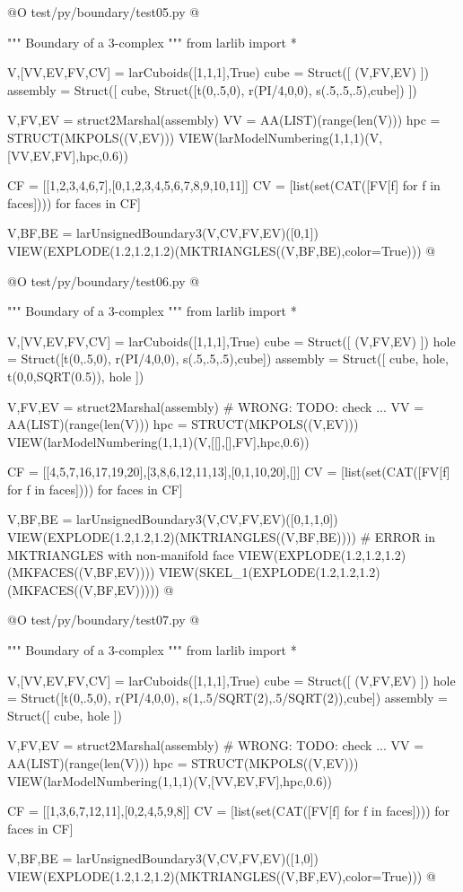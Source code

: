 \documentclass[11pt,oneside]{article}    %
\begin{document}
@O test/py/boundary/test05.py
@{""" Boundary of a 3-complex """
from larlib import *

V,[VV,EV,FV,CV] = larCuboids([1,1,1],True)
cube = Struct([ (V,FV,EV) ])
assembly = Struct([ cube, Struct([t(0,.5,0), r(PI/4,0,0), s(.5,.5,.5),cube]) ])

V,FV,EV = struct2Marshal(assembly)
VV = AA(LIST)(range(len(V)))
hpc = STRUCT(MKPOLS((V,EV)))
VIEW(larModelNumbering(1,1,1)(V,[VV,EV,FV],hpc,0.6))

CF = [[1,2,3,4,6,7],[0,1,2,3,4,5,6,7,8,9,10,11]]
CV = [list(set(CAT([FV[f]  for f in faces]))) for faces in CF]

V,BF,BE = larUnsignedBoundary3(V,CV,FV,EV)([0,1])
VIEW(EXPLODE(1.2,1.2,1.2)(MKTRIANGLES((V,BF,BE),color=True))) 
@}

@O test/py/boundary/test06.py
@{""" Boundary of a 3-complex """
from larlib import *

V,[VV,EV,FV,CV] = larCuboids([1,1,1],True)
cube = Struct([ (V,FV,EV) ])
hole = Struct([t(0,.5,0), r(PI/4,0,0), s(.5,.5,.5),cube])
assembly = Struct([ cube, hole, t(0,0,SQRT(0.5)), hole ])

V,FV,EV = struct2Marshal(assembly) # WRONG:  TODO: check ...
VV = AA(LIST)(range(len(V)))
hpc = STRUCT(MKPOLS((V,EV)))
VIEW(larModelNumbering(1,1,1)(V,[[],[],FV],hpc,0.6))

CF = [[4,5,7,16,17,19,20],[3,8,6,12,11,13],[0,1,10,20],[]]
CV = [list(set(CAT([FV[f]  for f in faces]))) for faces in CF]

V,BF,BE = larUnsignedBoundary3(V,CV,FV,EV)([0,1,1,0])
VIEW(EXPLODE(1.2,1.2,1.2)(MKTRIANGLES((V,BF,BE)))) # ERROR in MKTRIANGLES with non-manifold face
VIEW(EXPLODE(1.2,1.2,1.2)(MKFACES((V,BF,EV))))
VIEW(SKEL_1(EXPLODE(1.2,1.2,1.2)(MKFACES((V,BF,EV)))))
@}

@O test/py/boundary/test07.py
@{""" Boundary of a 3-complex """
from larlib import *

V,[VV,EV,FV,CV] = larCuboids([1,1,1],True)
cube = Struct([ (V,FV,EV) ])
hole = Struct([t(0,.5,0), r(PI/4,0,0), s(1,.5/SQRT(2),.5/SQRT(2)),cube])
assembly = Struct([ cube, hole ])

V,FV,EV = struct2Marshal(assembly) # WRONG:  TODO: check ...
VV = AA(LIST)(range(len(V)))
hpc = STRUCT(MKPOLS((V,EV)))
VIEW(larModelNumbering(1,1,1)(V,[VV,EV,FV],hpc,0.6))

CF = [[1,3,6,7,12,11],[0,2,4,5,9,8]]
CV = [list(set(CAT([FV[f]  for f in faces]))) for faces in CF]

V,BF,BE = larUnsignedBoundary3(V,CV,FV,EV)([1,0])
VIEW(EXPLODE(1.2,1.2,1.2)(MKTRIANGLES((V,BF,EV),color=True)))
@}
\end{document}
